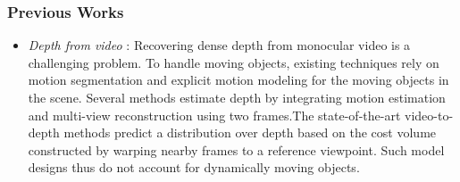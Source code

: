 \documentclass{beamer}
\begin{document}
	\begin{frame}
	\frametitle{Previous Works}
	\begin{itemize}
	
	\item \textit{Depth from video} : Recovering dense depth from monocular video is a challenging problem. To handle moving objects, existing techniques rely on motion segmentation and explicit motion modeling for the moving objects in the scene. 
	Several methods estimate depth by integrating motion estimation and multi-view reconstruction using two frames.The state-of-the-art video-to-depth methods predict a distribution over depth based on the cost volume constructed by warping nearby frames to a reference viewpoint. Such model designs thus do not account for dynamically moving objects.
	\end{itemize}
	
	\end{frame}
	
	
	
\end{document}
